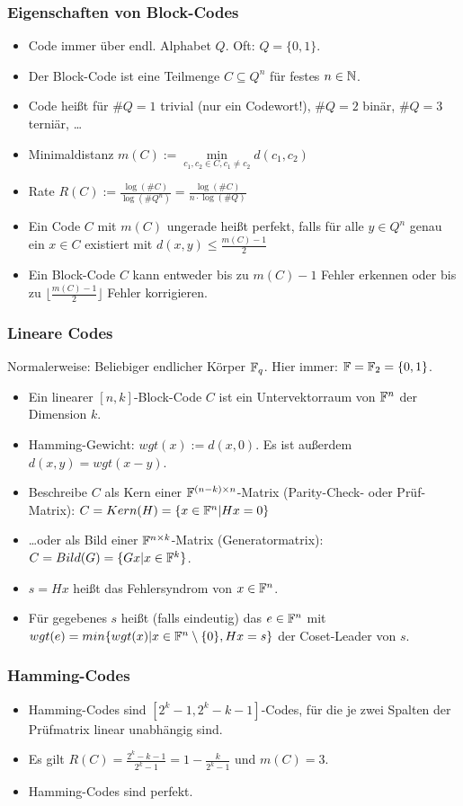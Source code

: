 \documentclass{beamer}
\newcommand{\F}{\ensuremath \mathbb{F}}
\newcommand{\N}{\ensuremath \mathbb{N}}
\begin{document}
\begin{frame}
\frametitle{Eigenschaften von Block-Codes}
\begin{itemize}
\item Code immer über endl. Alphabet $Q$. Oft: $Q=\{0,1\}$.
\item Der Block-Code ist eine Teilmenge $C\subseteq Q^n$ für festes $n\in\N$.
\item Code heißt für $\#Q=1$ trivial (nur ein Codewort!), $\#Q=2$ binär, $\#Q=3$ terniär, \ldots\pause
\item Minimaldistanz $m(C):=\min\limits_{c_1,c_2\in C,c_1\neq c_2} d(c_1,c_2)$
\item Rate $R(C):=\frac{\log(\#C)}{\log(\#Q^n)}=\frac{\log(\#C)}{n\cdot\log(\#Q)}$
\item Ein Code $C$ mit $m(C)$ ungerade heißt perfekt, falls für alle $y\in Q^n$ genau ein $x\in C$ existiert mit $d(x,y)\leq \frac{m(C)-1}{2}$\pause
\item Ein Block-Code $C$ kann entweder bis zu $m(C)-1$ Fehler erkennen oder bis zu $\lfloor\frac{m(C)-1}{2}\rfloor$ Fehler korrigieren.
\end{itemize}
\end{frame}

\begin{frame}
\frametitle{Lineare Codes}
Normalerweise: Beliebiger endlicher Körper $\F_q$. Hier immer: $\F=\F_2=\{0,1\}$.
\begin{itemize}
\item Ein linearer $[n,k]$-Block-Code $C$ ist ein Untervektorraum von $\F^n$ der Dimension $k$.\pause
\item Hamming-Gewicht: $wgt(x):=d(x,0)$. Es ist außerdem $d(x,y)=wgt(x-y)$.\pause
\item Beschreibe $C$ als Kern einer $\F^{(n-k)\times n}$-Matrix (Parity-Check- oder Prüf-Matrix): $C=Kern(H)=\{x\in\F^n|Hx=0\}$
\item \ldots oder als Bild einer $\F^{n\times k}$-Matrix (Generatormatrix): $C=Bild(G)=\{Gx|x\in\F^k\}$.\pause
\item $s=Hx$ heißt das Fehlersyndrom von $x\in\F^n$.\pause
\item Für gegebenes $s$ heißt (falls eindeutig) das $e\in\F^n$ mit
$wgt(e) = min\{wgt(x)|x \in \F^n\setminus\{0\}, Hx=s\}$ der Coset-Leader von $s$.
\end{itemize}
\end{frame}

\begin{frame}
\frametitle{Hamming-Codes}
\begin{itemize}
\item Hamming-Codes sind $[2^k - 1, 2^k - k - 1]$-Codes, für die je
zwei Spalten der Prüfmatrix linear unabhängig sind.\pause
\item Es gilt $R(C)=\frac{2^k-k-1}{2^k-1}=1-\frac{k}{2^k-1}$ und $m(C)=3$.
\item Hamming-Codes sind perfekt.
\end{itemize}
\end{frame}
\end{document}
